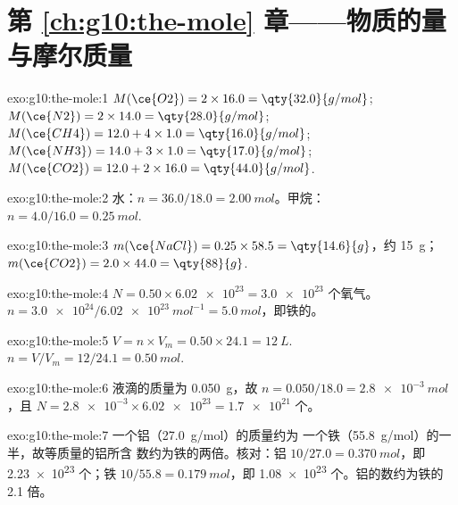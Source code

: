 \section*{第 \ref{ch:g10:the-mole} 章——物质的量与摩尔质量}

\begin{solution}{exo:g10:the-mole:1}
$M(\ce{O2}) = 2 \times 16.0 = \qty{32.0}{g/mol}$;
$M(\ce{N2}) = 2 \times 14.0 = \qty{28.0}{g/mol}$;
$M(\ce{CH4}) = 12.0 + 4 \times 1.0 = \qty{16.0}{g/mol}$;
$M(\ce{NH3}) = 14.0 + 3 \times 1.0 = \qty{17.0}{g/mol}$;
$M(\ce{CO2}) = 12.0 + 2 \times 16.0 = \qty{44.0}{g/mol}$.
\end{solution}

\begin{solution}{exo:g10:the-mole:2}
水：$n = 36.0 / 18.0 = \qty{2.00}{mol}$。甲烷：
$n = 4.0 / 16.0 = \qty{0.25}{mol}$.
\end{solution}

\begin{solution}{exo:g10:the-mole:3}
$m(\ce{NaCl}) = 0.25 \times 58.5 = \qty{14.6}{g}$，约 \qty{15}{g}；
$m(\ce{CO2}) = 2.0 \times 44.0 = \qty{88}{g}$.
\end{solution}

\begin{solution}{exo:g10:the-mole:4}
$N = 0.50 \times \num{6.02e23} = \num{3.0e23}$ 个氧气。
$n = \num{3.0e24} / \qty{6.02e23}{mol^{-1}} = \qty{5.0}{mol}$，即铁的。
\end{solution}

\begin{solution}{exo:g10:the-mole:5}
$V = n \times V_m = 0.50 \times 24.1 = \qty{12}{L}$.
$n = V / V_m = 12 / 24.1 = \qty{0.50}{mol}$.
\end{solution}

\begin{solution}{exo:g10:the-mole:6}
液滴的质量为 \qty{0.050}{g}，故
$n = 0.050 / 18.0 = \qty{2.8e-3}{mol}$，且
$N = \num{2.8e-3} \times \num{6.02e23} = \num{1.7e21}$ 个。
\end{solution}

\begin{solution}{exo:g10:the-mole:7}
一个铝（\qty{27.0}{g/mol}）的质量约为
一个铁（\qty{55.8}{g/mol}）的一半，故等质量的铝所含
数约为铁的两倍。核对：铝 $10/27.0 = \qty{0.370}{mol}$，即
\num{2.23e23} 个；铁 $10/55.8 = \qty{0.179}{mol}$，即
\num{1.08e23} 个。铝的数约为铁的 2.1 倍。
\end{solution}

